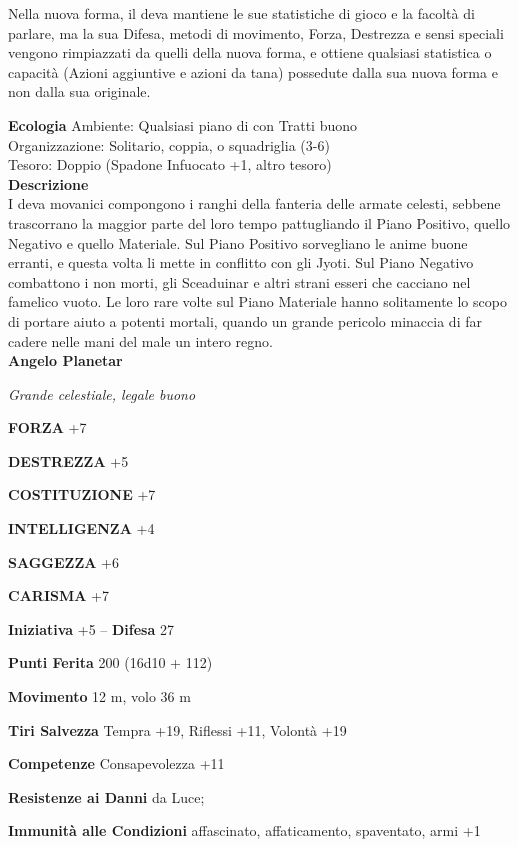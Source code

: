 \begin{multicols}{2}
Nella nuova forma, il deva mantiene le sue statistiche di gioco e la facoltà di parlare, ma la sua Difesa, metodi di movimento, Forza, Destrezza e sensi speciali vengono rimpiazzati da quelli della nuova forma, e ottiene qualsiasi statistica o capacità (Azioni aggiuntive e azioni da tana) possedute dalla sua nuova forma e non dalla sua originale.

\textbf{Ecologia}
Ambiente: Qualsiasi piano di con Tratti buono\\
Organizzazione: Solitario, coppia, o squadriglia (3-6)\\
Tesoro: Doppio (Spadone Infuocato +1, altro tesoro)\\
\textbf{Descrizione}\\
I deva movanici compongono i ranghi della fanteria delle armate celesti, sebbene trascorrano la maggior parte del loro tempo pattugliando il Piano Positivo, quello Negativo e quello Materiale. Sul Piano Positivo sorvegliano le anime buone erranti, e questa volta li mette in conflitto con gli Jyoti. Sul Piano Negativo combattono i non morti, gli Sceaduinar e altri strani esseri che cacciano nel famelico vuoto. Le loro rare volte sul Piano Materiale hanno solitamente lo scopo di portare aiuto a potenti mortali, quando un grande pericolo minaccia di far cadere nelle mani del male un intero regno.\\


\medskip{}\textbf{Angelo Planetar}

\emph{Grande celestiale, legale buono}

\textbf{FORZA} +7

\textbf{DESTREZZA} +5

\textbf{COSTITUZIONE} +7

\textbf{INTELLIGENZA} +4

\textbf{SAGGEZZA} +6

\textbf{CARISMA} +7

\textbf{Iniziativa} +5 -- \textbf{Difesa} 27

\textbf{Punti Ferita} 200 (16d10 + 112)

\textbf{Movimento} 12 m, volo 36 m

\textbf{Tiri Salvezza} Tempra +19, Riflessi +11, Volontà +19

\textbf{Competenze} Consapevolezza +11

\textbf{Resistenze ai Danni} da Luce;

\textbf{Immunità alle Condizioni} affascinato, affaticamento, spaventato, armi +1


\end{multicols}
